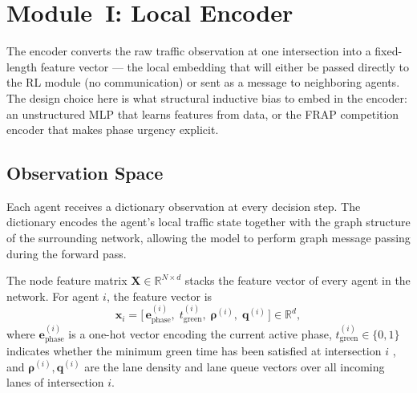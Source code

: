 \section{Module~I: Local Encoder}
\label{sec:Methodology_Encoder}

The encoder converts the raw traffic observation at one intersection into a fixed-length feature vector — the local embedding that will either be passed directly to the RL module (no communication) or sent as a message to neighboring agents. The design choice here is what structural inductive bias to embed in the encoder: an unstructured MLP that learns features from data, or the FRAP competition encoder that makes phase urgency explicit.

\subsection{Observation Space}
\label{sec:Methodology_ObservationSpace}

Each agent receives a dictionary observation at every decision step. The dictionary encodes the agent's local traffic state together with the graph structure of the surrounding network, allowing the model to perform graph message passing during the forward pass.

The node feature matrix $\mathbf{X} \in \mathbb{R}^{N \times d}$ stacks the feature vector of every agent in the network. For agent $i$, the feature vector is
\begin{equation}
  \mathbf{x}_i =
    \bigl[\,\mathbf{e}_{\mathrm{phase}}^{(i)},\;
           t_{\mathrm{green}}^{(i)},\;
           \boldsymbol{\rho}^{(i)},\;
           \mathbf{q}^{(i)}\,\bigr] \in \mathbb{R}^{d},
  \label{eq:node_feature}
\end{equation}
where $\mathbf{e}_{\mathrm{phase}}^{(i)}$ is a one-hot vector encoding the current active phase, $t_{\mathrm{green}}^{(i)}\in\{0,1\}$ indicates whether the minimum green time has been satisfied at intersection $i$ \citep{wei2018intellilight}, and $\boldsymbol{\rho}^{(i)}, \mathbf{q}^{(i)}$ are the lane density and lane queue vectors over all incoming lanes of intersection $i$.

